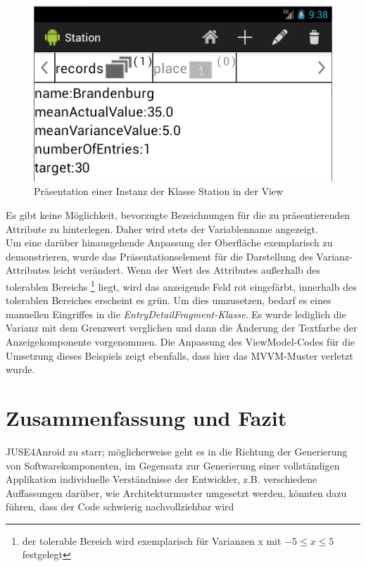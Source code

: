 \documentclass[a4paper,twoside]{article}
\begin{document}
\begin{figure}[!h]
	\centering
	\includegraphics[scale=.6]{pics/StationView.png}
	\caption{Präsentation einer Instanz der Klasse Station in der View}
	\label{fig:StationView}
\end{figure}
Es gibt keine Möglichkeit, bevorzugte Bezeichnungen für die zu präsentierenden Attribute zu hinterlegen. Daher wird stets der Variablenname angezeigt.\\
Um eine darüber hinausgehende Anpassung der Oberfläche exemplarisch zu demonstrieren, wurde das Präsentationselement für die Darstellung des Varianz-Attributes leicht verändert. Wenn der Wert des Attributes außerhalb des tolerablen Bereichs \footnote{der tolerable Bereich wird exemplarisch für Varianzen x mit \(-5 \le x \le 5\) festgelegt} liegt, wird das anzeigende Feld rot eingefärbt, innerhalb des tolerablen Bereiches erscheint es grün. Um dies umzusetzen, bedarf es eines manuellen Eingriffes in die \textit{EntryDetailFragment-Klasse}. Es wurde lediglich die Varianz mit dem Grenzwert verglichen und dann die Änderung der Textfarbe der Anzeigekomponente vorgenommen. Die Anpassung des ViewModel-Codes für die Umsetzung dieses Beispiels zeigt ebenfalls, dass hier das MVVM-Muster verletzt wurde.

\section{Zusammenfassung und Fazit}
JUSE4Anroid zu starr; möglicherweise geht es in die Richtung der Generierung von Softwarekomponenten, im Gegensatz zur Generierung einer vollständigen Applikation
individuelle Verständnisse der Entwickler, z.B. verschiedene Auffassungen darüber, wie Architekturmuster umgesetzt werden, könnten dazu führen, dass der Code schwierig nachvollziehbar wird
\end{document}
